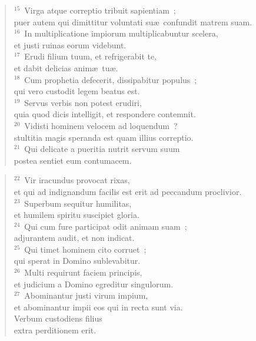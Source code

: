 \begin{flushleft}\begin{verse}${}^{15}$~Virga atque correptio tribuit sapientiam~;\\ puer autem qui dimittitur voluntati su\ae\ confundit matrem suam.\\
${}^{16}$~In multiplicatione impiorum multiplicabuntur scelera,\\ et justi ruinas eorum videbunt.\\
${}^{17}$~Erudi filium tuum, et refrigerabit te,\\ et dabit delicias anim\ae\ tu\ae .\\
${}^{18}$~Cum prophetia defecerit, dissipabitur populus~;\\ qui vero custodit legem beatus est.\\
${}^{19}$~Servus verbis non potest erudiri,\\ quia quod dicis intelligit, et respondere contemnit.\\
${}^{20}$~Vidisti hominem velocem ad loquendum~?\\ stultitia magis speranda est quam illius correptio.\\
${}^{21}$~Qui delicate a pueritia nutrit servum suum\\ postea sentiet eum contumacem.\end{verse}\end{flushleft}


\begin{flushleft}\begin{verse}${}^{22}$~Vir iracundus provocat rixas,\\ et qui ad indignandum facilis est erit ad peccandum proclivior.\\
${}^{23}$~Superbum sequitur humilitas,\\ et humilem spiritu suscipiet gloria.\\
${}^{24}$~Qui cum fure participat odit animam suam~;\\ adjurantem audit, et non indicat.\\
${}^{25}$~Qui timet hominem cito corruet~;\\ qui sperat in Domino sublevabitur.\\
${}^{26}$~Multi requirunt faciem principis,\\ et judicium a Domino egreditur singulorum.\\
${}^{27}$~Abominantur justi virum impium,\\ et abominantur impii eos qui in recta sunt via.\\ Verbum custodiens filius\\ extra perditionem erit.\end{verse}\end{flushleft}


